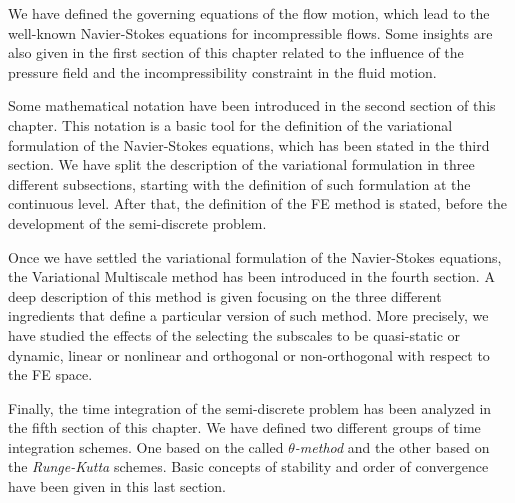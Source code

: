 We have defined the governing equations of the flow motion, which lead to the well-known Navier-Stokes equations for incompressible flows. Some insights are also given in the first section of this chapter related to the influence of the pressure field and the incompressibility constraint in the fluid motion.

Some mathematical notation have been introduced in the second section of this chapter. This notation is a basic tool for the definition of the variational formulation of the Navier-Stokes equations, which has been stated in the third section. We have split the description of the variational formulation in three different subsections, starting with the definition of such formulation at the continuous level. After that, the definition of the FE method is stated, before the development of the semi-discrete problem.

Once we have settled the variational formulation of the Navier-Stokes equations, the Variational Multiscale method has been introduced in the fourth section. A deep description of this method is given focusing on the three different ingredients that define a particular version of such method. More precisely, we have studied the effects of the selecting the subscales to be quasi-static or dynamic, linear or nonlinear and orthogonal or non-orthogonal with respect to the FE space.

Finally, the time integration of the semi-discrete problem has been analyzed in the fifth section of this chapter. We have defined two different groups of time integration schemes. One based on the called \textit{$\theta$-method} and the other based on the \textit{Runge-Kutta} schemes. Basic concepts of stability and order of convergence have been given in this last section.
